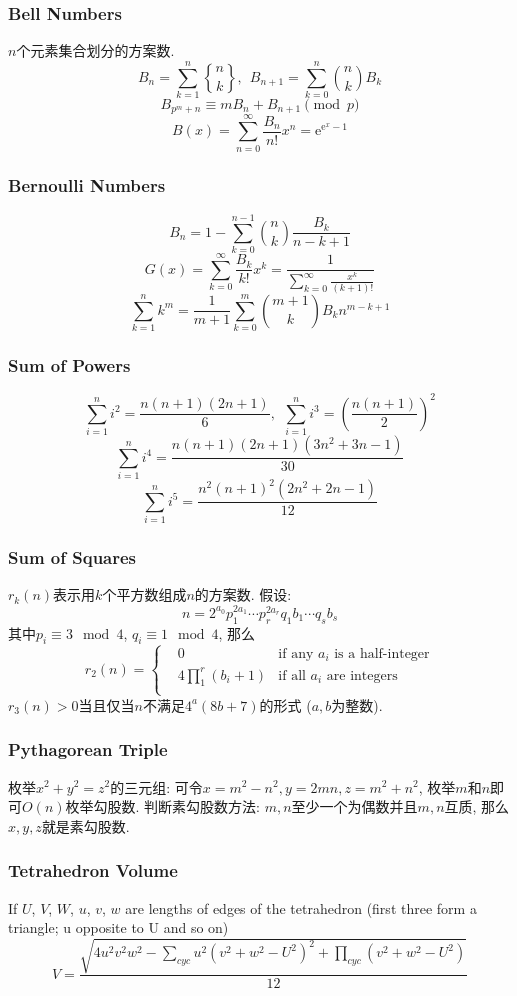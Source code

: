 \begin{small}
\subsubsection{Bell Numbers}
$n$个元素集合划分的方案数.
\[ B_n=\sum_{k=1}^{n}{n\brace k},\ \ B_{n+1} = \sum_{k=0}^n{n \choose k}B_k \]
\[ B_{p^m+n} \equiv mB_n+B_{n+1} \pmod{p} \]
\[B(x)=\sum_{n=0}^{\infty}\frac{B_n}{n!}x^n=\mathrm{e}^{\mathrm{e}^x-1}\]
\subsubsection{Bernoulli Numbers}
\[ B_n = 1 - \sum_{k=0}^{n-1}{n \choose k}\frac{B_k}{n-k+1} \]
\[ G(x) = \sum_{k=0}^{\infty}\frac{B_k}{k!}x^k
= \frac{1}{\sum_{k=0}^{\infty}\frac{x^k}{(k+1)!}} \]
\[ \sum_{k=1}^nk^m = \frac{1}{m+1}\sum_{k=0}^m{m+1 \choose k}B_kn^{m-k+1} \]
\subsubsection{Sum of Powers}
\[\sum_{i=1}^ni^2=\frac{n(n+1)(2n+1)}{6},\ \ \sum_{i=1}^ni^3=(\frac{n(n+1)}{2})^2\]
\[\sum_{i=1}^ni^4=\frac{n(n+1)(2n+1)(3n^2+3n-1)}{30}\]
\[\sum_{i=1}^ni^5=\frac{n^2(n+1)^2(2n^2+2n-1)}{12}\]
\subsubsection{Sum of Squares}
$r_k(n)$表示用$k$个平方数组成$n$的方案数. 假设: 
\[n=2^{a_0}p_1^{2a_1}\cdots p_r^{2a_r}q_1{b_1}\cdots q_s{b_s}\]
其中$p_i\equiv 3 \mod 4$, $q_i\equiv 1 \mod 4$, 那么
\[r_2(n)=\left\{\begin{aligned}
& 0 & \text{if any }a_i\text{ is a half-integer}\\
& 4\prod_1^r(b_i+1) & \text{if all }a_i\text{ are integers}\\
\end{aligned}\right.\]
$r_3(n)>0$当且仅当$n$不满足$4^a(8b+7)$的形式 ($a,b$为整数).
\subsubsection{Pythagorean Triple}
枚举$x^2+y^2=z^2$的三元组: 可令$x=m^2-n^2,y=2mn,z=m^2+n^2$, 枚举$m$和$n$即可$O(n)$枚举勾股数. 判断素勾股数方法: $m,n$至少一个为偶数并且$m,n$互质, 那么$x,y,z$就是素勾股数.
\subsubsection{Tetrahedron Volume}
If $U$, $V$, $W$, $u$, $v$, $w$ are lengths of edges of the tetrahedron (first three form a triangle; u opposite to U and so on)
\[ V = \frac{\sqrt{ 4u^2v^2w^2 - \sum_{cyc}{u^2(v^2+w^2-U^2)^2} + \prod_{cyc}{(v^2+w^2-U^2)} }}{12} \]

\end{small}
